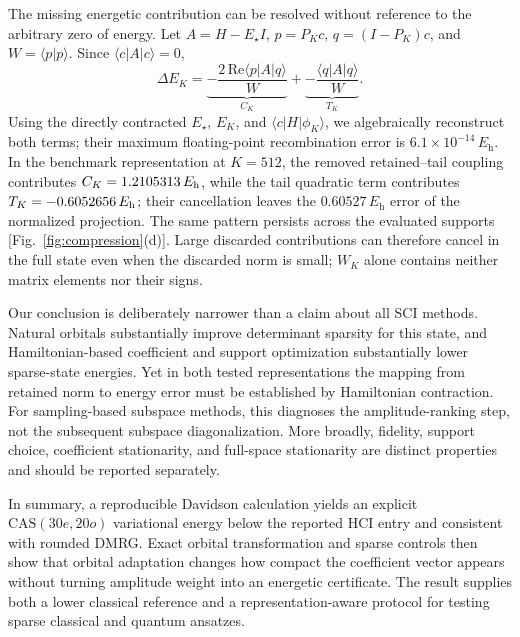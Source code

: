 \documentclass[
  aps,
  reprint,
  superscriptaddress,
  nofootinbib,
  longbibliography,
  floatfix
]{revtex4-2}
\newcommand{\Eh}{E_{\mathrm h}}
\newcommand{\cas}{\mathrm{CAS}(30e,20o)}
\begin{document}
The missing energetic contribution can be resolved without reference to the
arbitrary zero of energy.  Let \(A=H-E_\star I\),
\(p=P_Kc\), \(q=(I-P_K)c\), and \(W=\langle p|p\rangle\).  Since
\(\langle c|A|c\rangle=0\),
\begin{equation}
 \Delta E_K=
 \underbrace{-\frac{2\,\mathrm{Re}\langle p|A|q\rangle}{W}}_{C_K}
 +
 \underbrace{-\frac{\langle q|A|q\rangle}{W}}_{T_K}.
 \label{eq:decomposition}
\end{equation}
Using the directly contracted \(E_\star\), \(E_K\), and
\(\langle c|H|\phi_K\rangle\), we algebraically reconstruct both terms; their
maximum floating-point recombination error is
\(6.1\times10^{-14}\,\Eh\).  In the benchmark representation at \(K=512\),
the removed retained--tail coupling contributes
\(C_K=\BenchmarkKFiveTwelveCoupling\,\Eh\), while the tail quadratic term
contributes \(T_K=\BenchmarkKFiveTwelveTail\,\Eh\); their cancellation leaves
the \(0.60527\,\Eh\) error of the normalized projection.  The same pattern
persists across the evaluated supports [Fig.~\ref{fig:compression}(d)].  Large
discarded contributions can therefore cancel in the full state even when the
discarded norm is small; \(W_K\) alone contains neither matrix elements nor
their signs.

Our conclusion is deliberately narrower than a claim about all SCI methods.
Natural orbitals substantially improve determinant sparsity for this state,
and Hamiltonian-based coefficient and support optimization substantially lower
sparse-state energies.  Yet in both tested representations the mapping from
retained norm to energy error must be established by Hamiltonian contraction.
For sampling-based subspace methods, this diagnoses the amplitude-ranking step,
not the subsequent subspace diagonalization.  More broadly, fidelity, support
choice, coefficient stationarity, and full-space stationarity are distinct
properties and should be reported separately.

In summary, a reproducible Davidson calculation yields an explicit \(\cas\)
variational energy below the reported HCI entry and consistent with rounded
DMRG.  Exact orbital transformation and sparse controls then show that orbital
adaptation changes how compact the coefficient vector appears without turning
amplitude weight into an energetic certificate.  The result supplies both a
lower classical reference and a representation-aware protocol for testing
sparse classical and quantum ansatzes.


\end{document}
